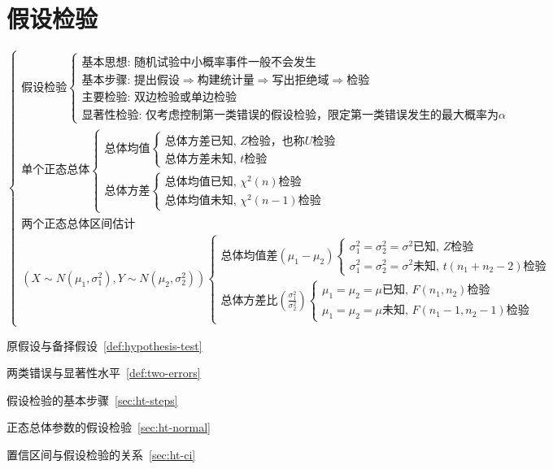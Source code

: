 \documentclass[lang=cn,11pt]{elegantbook}
\begin{document}
\chapter{假设检验}
\[
\begin{cases}
\text{假设检验}
\begin{cases}
\text{基本思想: 随机试验中小概率事件一般不会发生} \\
\text{基本步骤: 提出假设} \Rightarrow \text{构建统计量} \Rightarrow \text{写出拒绝域} \Rightarrow \text{检验} \\
\text{主要检验: 双边检验或单边检验} \\
\text{显著性检验: 仅考虑控制第一类错误的假设检验，限定第一类错误发生的最大概率为} \alpha
\end{cases} \\
\text{单个正态总体}
\begin{cases}
\text{总体均值}
\begin{cases}
\text{总体方差已知, } Z\text{检验，也称} U\text{检验} \\
\text{总体方差未知, } t\text{检验}
\end{cases} \\
\text{总体方差}
\begin{cases}
\text{总体均值已知, } \chi^2(n)\text{检验} \\
\text{总体均值未知, } \chi^2(n-1)\text{检验}
\end{cases}
\end{cases} \\
\text{两个正态总体区间估计} \\
(X \sim N(\mu_1,\sigma_1^2), Y \sim N(\mu_2,\sigma_2^2))
\begin{cases}
\text{总体均值差} (\mu_1-\mu_2)
\begin{cases}
\sigma_1^2=\sigma_2^2=\sigma^2\text{已知, } Z\text{检验} \\
\sigma_1^2=\sigma_2^2=\sigma^2\text{未知, } t(n_1+n_2-2)\text{检验}
\end{cases} \\
\text{总体方差比} \left( \frac{\sigma_1^2}{\sigma_2^2} \right)
\begin{cases}
\mu_1=\mu_2=\mu\text{已知, } F(n_1,n_2)\text{检验} \\
\mu_1=\mu_2=\mu\text{未知, } F(n_1-1,n_2-1)\text{检验}
\end{cases}
\end{cases}
\end{cases}
\]

\begin{introduction}
    \item 原假设与备择假设~\ref{def:hypothesis-test}
    \item 两类错误与显著性水平~\ref{def:two-errors}
    \item 假设检验的基本步骤~\ref{sec:ht-steps}
    \item 正态总体参数的假设检验~\ref{sec:ht-normal}
    \item 置信区间与假设检验的关系~\ref{sec:ht-ci}
\end{introduction}
\end{document}
